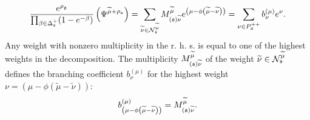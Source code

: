 \begin{Prop}
\begin{equation}
\frac{e^{\rho _{\frak{g}}}}{\prod_{\beta \in \Delta _{\frak{s}%
}^{+}}(1-e^{-\beta })}\left( \Psi ^{\widetilde{\mu }+\rho _{\frak{s}%
}}\right) =\sum_{\widetilde{\nu }\in \mathcal{N}_{\frak{s}}^{\widetilde{\mu }%
}}M_{\left( \frak{s}\right) \widetilde{\nu }}^{\widetilde{\mu }}e^{\left(
\mu -\phi \left( \widetilde{\mu }-\widetilde{\nu }\right) \right)
}=\sum_{\nu \in P_{\frak{a}}^{++}}b_{\nu }^{(\mu )}e^{\nu }.
\label{singular main-4}
\end{equation}
Any weight with nonzero multiplicity in the r. h. s. is equal to one of the
highest weights in the decomposition. The multiplicity $M_{\left( \frak{s}%
\right) \widetilde{\nu }}^{\widetilde{\mu }}$ of the weight  $\widetilde{\nu
}\in \mathcal{N}_{\frak{s}}^{\widetilde{\mu }}$ defines the branching
coefficient $b_{\nu }^{(\mu )}$ for the highest weight $\nu =\left( \mu
-\phi \left( \widetilde{\mu }-\widetilde{\nu }\right) \right) $:
\[
b_{\left( \mu -\phi \left( \widetilde{\mu }-\widetilde{\nu }\right) \right)
}^{(\mu )}=M_{\left( \frak{s}\right) \widetilde{\nu }}^{\widetilde{\mu }}.
\]
\end{Prop}

